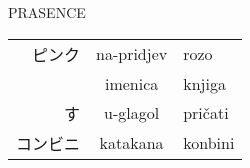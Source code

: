 \documentclass[10pt, utf8, border=0.4cm]{standalone}
\begin{document}
	\parbox{6cm}{
	\pagecolor{maroon}
	\color{fuchsia}
	\centering
	{\Large \color{lime} PRASENCE} \br
	
	\begin{tabular}{RCl}
		ピンク & na-pridjev & rozo \\
		 & imenica & knjiga \\
		す & u-glagol & pričati \\
		コンビニ & katakana & konbini \\
	\end{tabular}
}
\end{document}
